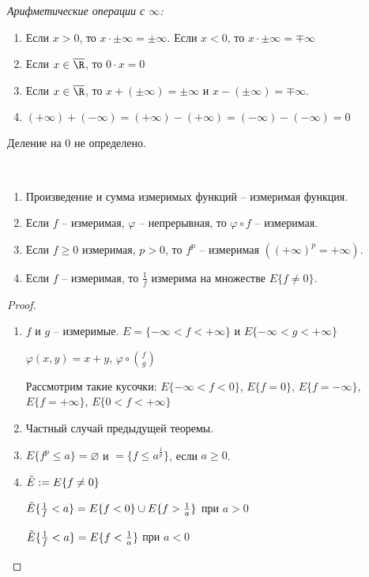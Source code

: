 \begin{definition}
    \textit{Арифметические операции с $\infty$:}

    \begin{enumerate}
        \item Если $x> 0$, то $x\cdot \pm \infty = \pm \infty$.
        Если $x< 0$, то $x\cdot \pm \infty = \mp \infty$

        \item Если $x\in \overline{\R}$, то $0\cdot x =0$
        \item Если $x\in \overline{\R}$, то $x+(\pm \infty)=\pm \infty$ и $x-(\pm \infty)=\mp \infty$.
        \item $(+\infty )+(-\infty)=(+\infty) - (+\infty) = (-\infty) -(-\infty) = 0$
    \end{enumerate}

    Деление на 0 не определено.
\end{definition}

\begin{theorem}~
    \begin{enumerate}
        \item Произведение и сумма измеримых функций – измеримая функция.
        \item Если $f$ – измеримая, $\varphi$ – непрерывная, то $\varphi \circ f$ – измеримая.
        \item Если $f\geq 0$ измеримая, $p>0$, то $f^p$ – измеримая $((+\infty)^p = +\infty)$.
        \item Если $f$ – измеримая, то $\frac{1}{f}$ измерима на множестве $E\{f\not = 0\}$.
    \end{enumerate}
\end{theorem}

\begin{proof}~
    \begin{enumerate}
        \item $f$ и $g$ – измеримые. $E=\{-\infty < f < +\infty\}$ и $E\{-\infty < g < +\infty\}$
        
        $\varphi(x, y)=x+ y$, $\varphi \circ \binom{f}{g}$

        Рассмотрим такие кусочки: $E\{-\infty < f < 0\}$, $E\{f=0\}$, $E\{ f = -\infty\}$, $E\{f = +\infty\}$, $E\{0 < f < +\infty\}$

        \item Частный случай предыдущей теоремы.
        \item $E\{f^p \leq a\}=\varnothing$ и $=\{f \leq a^{\frac{1}{p}}\}$, если $a\geq 0$.
        \item $\Tilde{E}:=E\{f\not = 0\}$
        
        $\Tilde{E}\{\frac{1}{f}< a\}= E\{f < 0\}\cup E\{f > \frac{1}{a}\}$ при $a>0$

        $\Tilde{E}\{\frac{1}{f}< a\}= E\{f < \frac{1}{a}\}$ при $a<0$
    \end{enumerate}
\end{proof}

